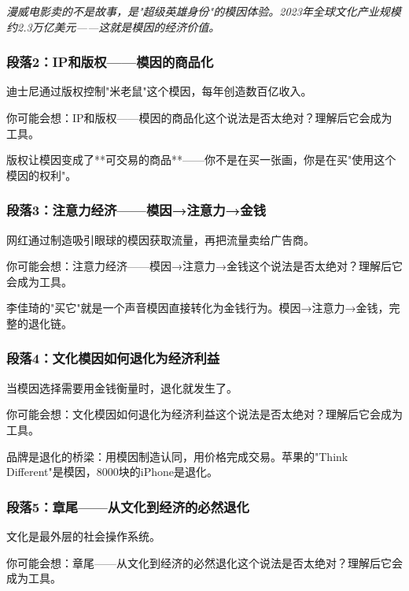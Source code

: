 \documentclass[a4paper,12pt]{book}
\newenvironment{motivation}{\begin{tcolorbox}[colback=gray!10,colframe=gray!60,title=\textit{动机}]\small\itshape}{\end{tcolorbox}}
\begin{document}
\begin{motivation}
\begin{motivation}
\begin{motivation}
漫威电影卖的不是故事，是"超级英雄身份"的模因体验。2023年全球文化产业规模约2.3万亿美元——这就是模因的经济价值。

	\subsubsection*{段落2：IP和版权——模因的商品化}
	迪士尼通过版权控制"米老鼠"这个模因，每年创造数百亿收入。
	\begin{tcolorbox}[colback=yellow!5, title=\textit{读者行为预测}]
		你可能会想：IP和版权——模因的商品化这个说法是否太绝对？理解后它会成为工具。
	\end{tcolorbox}

版权让模因变成了**可交易的商品**——你不是在买一张画，你是在买"使用这个模因的权利"。

	\subsubsection*{段落3：注意力经济——模因→注意力→金钱}
	网红通过制造吸引眼球的模因获取流量，再把流量卖给广告商。
	\begin{tcolorbox}[colback=yellow!5, title=\textit{读者行为预测}]
		你可能会想：注意力经济——模因→注意力→金钱这个说法是否太绝对？理解后它会成为工具。
	\end{tcolorbox}

李佳琦的"买它"就是一个声音模因直接转化为金钱行为。模因→注意力→金钱，完整的退化链。

	\subsubsection*{段落4：文化模因如何退化为经济利益}
	当模因选择需要用金钱衡量时，退化就发生了。
	\begin{tcolorbox}[colback=yellow!5, title=\textit{读者行为预测}]
		你可能会想：文化模因如何退化为经济利益这个说法是否太绝对？理解后它会成为工具。
	\end{tcolorbox}

品牌是退化的桥梁：用模因制造认同，用价格完成交易。苹果的"Think Different"是模因，8000块的iPhone是退化。

	\subsubsection*{段落5：章尾——从文化到经济的必然退化}
	文化是最外层的社会操作系统。
	\begin{tcolorbox}[colback=yellow!5, title=\textit{读者行为预测}]
		你可能会想：章尾——从文化到经济的必然退化这个说法是否太绝对？理解后它会成为工具。
	\end{tcolorbox}


\end{motivation}
\end{motivation}
\end{motivation}
\end{document}
